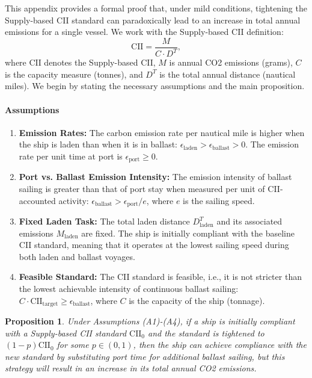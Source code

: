 \documentclass[11pt,english]{article}
\newtheorem{proposition}{Proposition}
\begin{document}
This appendix provides a formal proof that, under mild conditions, tightening the Supply-based CII standard can paradoxically lead to an increase in total annual emissions for a single vessel. We work with the Supply-based CII definition: $$\text{CII}=\frac{M}{C\cdot D^T},$$ 
where $\text{CII}$ denotes the Supply-based CII, \(M\) is annual CO2 emissions (grams), \(C\) is the capacity measure (tonnes), and \(D^T\) is the total annual distance (nautical miles). We begin by stating the necessary assumptions and the main proposition.

\paragraph{Assumptions}
\begin{enumerate}[label=(A\arabic*)]
    \item \textbf{Emission Rates:} The carbon emission rate per nautical mile is higher when the ship is laden than when it is in ballast: $\epsilon_{\text{laden}} > \epsilon_{\text{ballast}} > 0$. The emission rate per unit time at port is $\epsilon_{\text{port}} \ge 0$.
    \item \textbf{Port vs. Ballast Emission Intensity:} The emission intensity of ballast sailing is greater than that of port stay when measured per unit of CII-accounted activity: $\epsilon_{\text{ballast}} > \epsilon_{\text{port}} / e$, where $e$ is the sailing speed.
    \item \textbf{Fixed Laden Task:} The total laden distance $D^T_{\text{laden}}$ and its associated emissions $M_{\text{laden}}$ are fixed. The ship is initially compliant with the baseline CII standard, meaning that it operates at the lowest sailing speed during both laden and ballast voyages.
    \item \textbf{Feasible Standard:} The CII standard is feasible, i.e., it is not stricter than the lowest achievable intensity of continuous ballast sailing: $C\cdot\mathrm{CII}_{\text{target}} \ge \epsilon_{\text{ballast}}$, where $C$ is the capacity of the ship (tonnage).
\end{enumerate}

\begin{proposition}
Under Assumptions (A1)-(A4), if a ship is initially compliant with a Supply-based CII standard $\mathrm{CII}_0$ and the standard is tightened to $(1-p)\mathrm{CII}_0$ for some $p \in (0,1)$, then the ship can achieve compliance with the new standard by substituting port time for additional ballast sailing, but this strategy will result in an increase in its total annual CO2 emissions.
\end{proposition}
\end{document}
